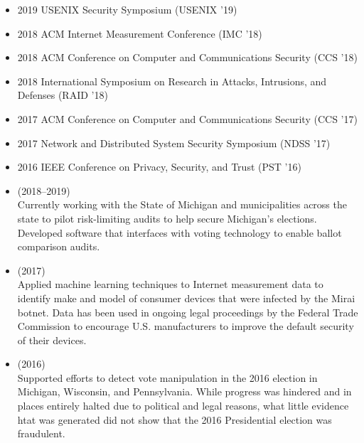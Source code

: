 \documentclass[11pt]{article}
\begin{document}
\vspace{-6pt}
\begin{itemize}[label={--\ },leftmargin=0.25in,labelsep=0.1625em]
\addtolength{\itemsep}{-0.5\baselineskip}

\item 2019 USENIX Security Symposium (USENIX '19)
\item 2018 ACM Internet Measurement Conference (IMC '18)
\item 2018 ACM Conference on Computer and Communications Security (CCS '18)
\item 2018 International Symposium on Research in Attacks, Intrusions, and Defenses (RAID '18)
\item 2017 ACM Conference on Computer and Communications Security (CCS '17)
\item 2017 Network and Distributed System Security Symposium (NDSS '17)
\item 2016 IEEE Conference on Privacy, Security, and Trust (PST '16)
\end{itemize}


\begin{itemize}[label={--\ },leftmargin=0.25in,labelsep=0.1625em]
\addtolength{\itemsep}{-0.25\baselineskip}

\item{} (2018--2019)\\
{\small Currently working with the State of Michigan and municipalities across the state to pilot risk-limiting audits to help secure Michigan's elections. Developed software that interfaces with voting technology to enable ballot comparison audits.}

\item{} (2017)\\
{\small Applied machine learning techniques to Internet measurement data to identify make and model of consumer devices that were infected by the Mirai botnet. Data has been used in ongoing legal proceedings by the Federal Trade Commission to encourage U.S. manufacturers to improve the default security of their devices.}
\item{} (2016)\\
{\small Supported efforts to detect vote manipulation in the 2016 election in Michigan, Wisconsin, and Pennsylvania. While progress was hindered and in places entirely halted due to political and legal reasons, what little evidence htat was generated did not show that the 2016 Presidential election was fraudulent.}
\end{itemize}
\end{document}
